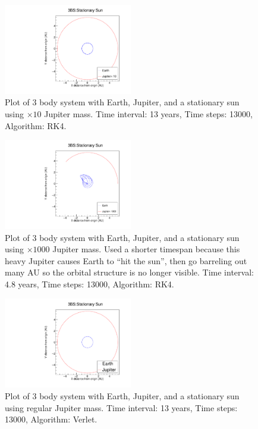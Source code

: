 \documentclass[a4paper,12pt]{report}
\begin{document}
  \begin{figure}[H]
 \centering
   \includegraphics[width=0.5\textwidth]{ESJFRK4_x10.pdf}
  \caption{Plot of 3 body system with Earth, Jupiter, and a stationary sun using $\times 10$ Jupiter mass. Time interval: 13 years, Time steps: 13000, Algorithm: RK4.}
  \label{fig:ESJFRK4_x10}
 \end{figure}
 
  \begin{figure}[H]
 \centering
   \includegraphics[width=0.5\textwidth]{ESJFRK4_x1000.pdf}
  \caption{Plot of 3 body system with Earth, Jupiter, and a stationary sun using $\times 1000$ Jupiter mass. Used a shorter timespan because this heavy Jupiter causes Earth to ``hit the sun'', then go barreling out many AU so the orbital structure is no longer visible. Time interval: 4.8 years, Time steps: 13000, Algorithm: RK4.}
  \label{fig:ESJFRK4_x1000}
 \end{figure}
 
 \begin{figure}[H]
 \centering
   \includegraphics[width=0.5\textwidth]{ESJFVerlet_reg.pdf}
  \caption{Plot of 3 body system with Earth, Jupiter, and a stationary sun using regular Jupiter mass. Time interval: 13 years, Time steps: 13000, Algorithm: Verlet.}
  \label{fig:ESJFVerlet_reg}
 \end{figure}
 
\end{document}
